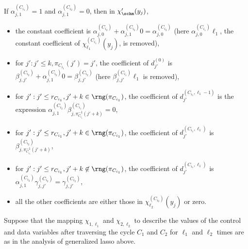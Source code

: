 If $\alpha^{(C_{i_1})}_{j,1} = 1$ and $\alpha^{(C_{i_2})}_{j,1} = 0$, then in $\chi'_\schm(y_j)$,
\begin{itemize}
\item the constant coefficient is $ \alpha^{(C_{i_2})}_{j,0} + \alpha^{(C_{i_2})}_{j,1} 0 = \alpha^{(C_{i_2})}_{j,0}$ (here $\alpha^{(C_{i_1})}_{j,0} \ell_1$, the constant coefficient of $\chi^{(C_{i_1})}_{\ell_1}(y_j)$, is removed),
%
\item for $j': j' \le k, \pi_{C_{i_1}}(j') = j'$, the coefficient of $d^{(0)}_{j'}$ is $\beta^{(C_{i_2})}_{j, j'}  + \alpha^{(C_{i_2})}_{j,1} 0 = \beta^{(C_{i_2})}_{j,j'}$ (here $\beta^{(C_{i_1})}_{j,j'} \ell_1$ is removed),
%
\item for $j': j' \le r_{C_{i_1}}, j'+k \in \rng(\pi_{C_{i_1}})$, the coefficient of $d^{(C_{i_1},\ell_1-1)}_{j'}$ is the expression $\alpha^{(C_{i_2})}_{j,1} \beta^{(C_{i_1})}_{j, \pi^{-1}_{C_{i_1}}(j'+k)} = 0$,
%
\item for $j': j' \le r_{C_{i_1}}, j'+k \in \rng(\pi_{C_{i_1}})$, the coefficient of $d^{(C_{i_1},\ell_1)}_{j'}$ is $\beta^{(C_{i_2})}_{j, \pi^{-1}_{C_{i_1}}(j'+k)}$,
%
\item for $j': j' \le r_{C_{i_1}}, j'+k \not \in \rng(\pi_{C_{i_1}})$, the coefficient of $d^{(C_{i_1},\ell_1)}_{j'}$ is $\alpha^{(C_{i_2})}_{j,1}  \gamma^{(C_{i_2})}_{j,j'} = \gamma^{(C_{i_2})}_{j,j'}$,
%
\item all the other coefficients are either those in $\chi^{(C_{i_2})}_{\ell_2}(y_j)$ or zero.
\end{itemize}




Suppose that the mapping $\chi_{1,\ell_1}$ and $\chi_{2,\ell_2}$ to describe the values of the control and data variables after traversing the cycle $C_1$ and $C_2$ for $\ell_1$ and $\ell_2$ times are as in the analysis of generalized lasso above.


